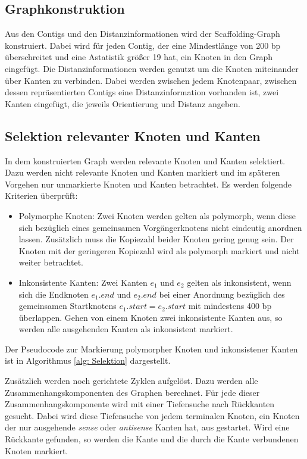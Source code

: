 \documentclass[a4paper,10pt,parskip]{scrartcl}
\begin{document}
\subsection{Graphkonstruktion}
Aus den Contigs und den Distanzinformationen wird der
Scaffolding-Graph konstruiert. Dabei wird für jeden Contig, der eine
Mindestlänge von 200 bp überschreitet und eine Astatistik größer 19
hat, ein Knoten in den Graph eingefügt. Die Distanzinformationen
werden genutzt um die Knoten miteinander über Kanten zu
verbinden. Dabei werden zwischen jedem Knotenpaar, zwischen dessen
repräsentierten Contigs eine Distanzinformation vorhanden ist, zwei
Kanten eingefügt, die jeweils Orientierung und Distanz angeben.

\subsection{Selektion relevanter Knoten und Kanten}
In dem konstruierten Graph werden relevante Knoten und Kanten
selektiert. Dazu werden nicht relevante Knoten und Kanten markiert und
im späteren Vorgehen nur unmarkierte Knoten und Kanten betrachtet. Es
werden folgende Kriterien überprüft:
\begin{itemize}
\item Polymorphe Knoten: Zwei Knoten werden gelten als polymorph, wenn
  diese sich bezüglich eines gemeinsamen Vorgängerknotens nicht
  eindeutig anordnen lassen. Zusätzlich muss die Kopiezahl beider
  Knoten gering genug sein. Der Knoten mit der geringeren Kopiezahl
  wird als polymorph markiert und nicht weiter betrachtet.
\item Inkonsistente Kanten: Zwei Kanten $e_1$ und $e_2$ gelten als
  inkonsistent, wenn sich die Endknoten $e_1.end$ und $e_2.end$ bei
  einer Anordnung bezüglich des gemeinsamen Startknotens $e_1.start =
  e_2.start$ mit mindestens 400 bp überlappen. Gehen von einem Knoten
  zwei inkonsistente Kanten aus, so werden alle ausgehenden Kanten als
  inkonsistent markiert.
\end{itemize}
Der Pseudocode zur Markierung polymorpher Knoten und inkonsistener
Kanten ist in Algorithmus \ref{alg: Selektion} dargestellt.

Zusätzlich werden noch gerichtete Zyklen aufgelöst. Dazu werden alle
Zusammenhangskomponenten des Graphen berechnet. Für jede dieser
Zusammenhangskomponente wird mit einer Tiefensuche nach Rückkanten
gesucht. Dabei wird diese Tiefensuche von jedem terminalen Knoten, ein
Knoten der nur ausgehende \textit{sense} oder \textit{antisense}
Kanten hat, aus gestartet. Wird eine Rückkante gefunden, so werden die
Kante und die durch die Kante verbundenen Knoten markiert.
\end{document}
